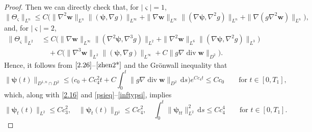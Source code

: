 \documentclass[11pt,reqno]{amsart}
\DeclareMathOperator{\diver}{\mathrm{div}}
\numberwithin{rk}{section}
\numberwithin{prop}{section}
\numberwithin{mydef}{section}
\numberwithin{lem}{section}
\numberwithin{equation}{section}
\numberwithin{thm}{section}
\begin{document}
\begin{proof}
Then we can directly check that, for $|\boldsymbol{\varsigma}|=1$,
\begin{equation}\label{zhen2}
\|\Theta_{\boldsymbol{\varsigma}} \|_{L^n}\leq C\big(\|\nabla^2 \boldsymbol{w}\|_{L^n}\|(\boldsymbol{\psi},\nabla g)\|_{L^\infty} + \|\nabla \boldsymbol{w}\|_{L^\infty} \|(\nabla\boldsymbol{\psi},\nabla^2 g)\|_{L^n}
+\|\nabla(g\nabla^2 \boldsymbol{w})\|_{L^n}\big),
\end{equation}
and, for $|\boldsymbol{\varsigma}|=2$, 
\begin{equation}\label{zhen2*}
\begin{aligned}
\|\Theta_{\boldsymbol{\varsigma}} \|_{L^2}&\leq C\big(\|\nabla \boldsymbol{w}\|_{L^\infty}\|(\nabla^2\boldsymbol{\psi},\nabla^3 g)\|_{L^2}+\|\nabla^2 \boldsymbol{w}\|_{L^6}\|(\nabla\boldsymbol{\psi},\nabla^2 g)\|_{L^3}\big)\\
&\quad +C\big(\|\nabla^3 \boldsymbol{w}\|_{L^2} \|(\boldsymbol{\psi},\nabla g)\|_{L^\infty}+C\|g\nabla \diver\boldsymbol{w}\|_{D^2}\big).
\end{aligned}
\end{equation}
Hence, it follows from $\eqref{2.26}$--$\eqref{zhen2*}$ and the Gr\"onwall inequality that
\begin{equation*}
\|\boldsymbol{\psi}(t)\|_{D^{1,n}\cap D^2}\leq  \Big(c_0+Cc^2_4t+C\int_0^t \|g\nabla \diver\boldsymbol{w}\|_{D^2} \,\mathrm{d}s\Big) e^{Cc_4t}\leq Cc_0\qquad \text{for $t\in [0,T_1]$},
\end{equation*}
which, along with \eqref{2.16} and \eqref{psieq}--\eqref{inftypsi}, implies 
\begin{equation*}
\|\boldsymbol{\psi}_t(t)\|_{L^2}\leq Cc^2_3,\quad 
\|\boldsymbol{\psi}_t(t)\|_{D^1} \leq Cc^2_4,\quad  \int_0^t \|\boldsymbol{\psi}_{tt}\|^2_{L^2} \,\mathrm{d}s\leq Cc^4_4\qquad\text{for $t\in [0,T_1]$}.
\end{equation*}
\end{proof}
\end{document}

